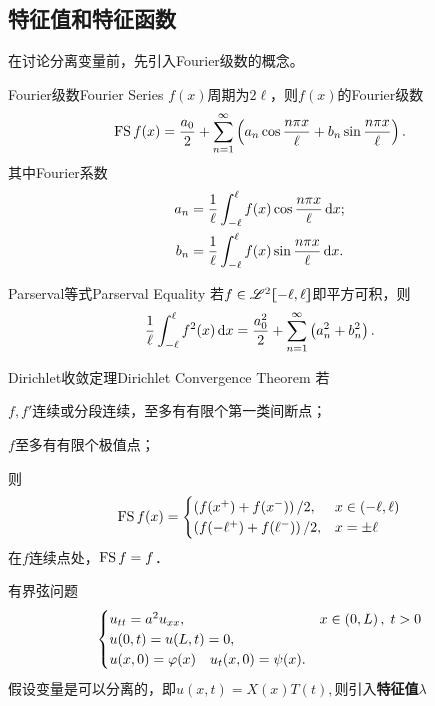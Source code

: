 \subsection{特征值和特征函数}
在讨论分离变量前，先引入Fourier级数的概念。
\begin{definition}{Fourier级数}{Fourier Series}
	$f(x)$周期为$2\ell$，则$f(x)$的Fourier级数
	\begin{align}
		\operatorname{FS} f(x)=\frac{a_0}2+\sum_{n=1}^\infty\left(a_n\cos\frac{n\pi x}\ell+b_n\sin\frac{n\pi x}\ell\right).
	\end{align}
	其中Fourier系数
	\begin{align*}
		a_n & =\frac1\ell\int_{-\ell}^\ell f(x)\cos\frac{n\pi x}\ell\mathop{}\!\mathrm{d} x; \\
		b_n & =\frac1\ell\int_{-\ell}^\ell f(x)\sin\frac{n\pi x}\ell\mathop{}\!\mathrm{d} x.
	\end{align*}
\end{definition}
\begin{theorem}{Parserval等式}{Parserval Equality}
	若$f\in\mathscr L^2\lfloor\hspace{-4.7 pt}\lceil -\ell,\ell\rceil\hspace{-4.7 pt}\rfloor$即平方可积，则
	\[\frac1\ell\int_{-\ell}^\ell f^2(x)\mathop{}\!\mathrm{d} x=\frac{a_0^2}2+\sum_{n=1}^\infty\left(a_n^2+b_n^2\right).\]
\end{theorem}
\begin{theorem}{Dirichlet收敛定理}{Dirichlet Convergence Theorem}
	若
	\begin{compactenum}
		\item $f,f'$连续或分段连续，至多有有限个第一类间断点；%
		\item $f$至多有有限个极值点；
	\end{compactenum}
	则
	\begin{align*}
		\operatorname{FS} f(x)
		=\begin{cases}
			\left(f(x^+)+f(x^-)\right)/2,        & x\in(-\ell,\ell) \\
			\left(f(-\ell^+)+f(\ell^-)\right)/2, & x=\pm\ell
		\end{cases}
	\end{align*}
	在$f$连续点处，$\operatorname{FS} f=f$．
\end{theorem}
\eg[1] 有界弦问题
\begin{align*}
	\begin{cases}
		u_{tt}=a^2u_{xx},&x\in\left(0,L\right),\;t>0 \\
		u(0,t)=u(L,t)=0,                 \\
		u(x,0)=\varphi(x)\quad u_t(x,0)=\psi(x).
	\end{cases}
\end{align*}
假设变量是可以分离的，即$u(x,t)=X(x)T(t),$则引入\textbf{特征值}$\lambda$
